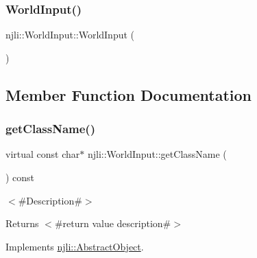 \subsubsection{\texorpdfstring{World\+Input()}{WorldInput()}\hspace{0.1cm}{\footnotesize\ttfamily [2/2]}}
{\footnotesize\ttfamily njli\+::\+World\+Input\+::\+World\+Input (\begin{DoxyParamCaption}\item[{const \mbox{\hyperlink{classnjli_1_1_world_input}{World\+Input}} \&}]{ }\end{DoxyParamCaption})\hspace{0.3cm}{\ttfamily [private]}}



\subsection{Member Function Documentation}
\mbox{\label{classnjli_1_1_world_input_a52568419faf8a25092f2261640598d63}} 
\subsubsection{\texorpdfstring{get\+Class\+Name()}{getClassName()}}
{\footnotesize\ttfamily virtual const char$\ast$ njli\+::\+World\+Input\+::get\+Class\+Name (\begin{DoxyParamCaption}{ }\end{DoxyParamCaption}) const\hspace{0.3cm}{\ttfamily [virtual]}}

$<$\#\+Description\#$>$

\begin{DoxyReturn}{Returns}
$<$\#return value description\#$>$ 
\end{DoxyReturn}


Implements \mbox{\hyperlink{classnjli_1_1_abstract_object_afdabb48c4bf763e297ffe810b433a863}{njli\+::\+Abstract\+Object}}.

\mbox{\label{classnjli_1_1_world_input_ad41266885be835f3ee602311e20877a4}} 
